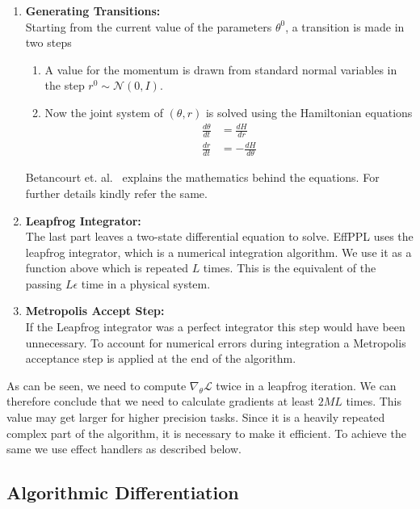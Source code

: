 \documentclass[a4paper,11pt]{article}
\theoremstyle{mytheor}
\begin{document}
	\begin{enumerate}
	    \item \textbf{Generating Transitions:}\\
    	Starting from the current value of the parameters $\theta^0$, a transition is made in two steps
    	\begin{enumerate}
    	    \item A value for the momentum is drawn from standard normal variables in the step $r^0 \sim \mathcal{N}(0, I)$. 
    	    \item Now the joint system of $(\theta, r)$ is solved using the Hamiltonian equations
    	    \begin{align*}
    	        \frac{d\theta}{dt} &= \frac{dH}{dr}\\
    	        \frac{dr}{dt} &= - \frac{dH}{d\theta}
    	    \end{align*}
    	\end{enumerate}
    	Betancourt et. al.~\cite{betancourt2018conceptual} explains the mathematics behind the equations. For further details kindly refer the same. 
    	\item \textbf{Leapfrog Integrator:}\\
    		The last part leaves a two-state differential equation to solve. EffPPL uses the leapfrog integrator, which is a numerical integration algorithm. We use it as a function above which is repeated $L$ times. This is the equivalent of the passing $L\epsilon$ time in a physical system. 
		\item \textbf{Metropolis Accept Step:}\\ If the Leapfrog integrator was a perfect integrator this step would have been unnecessary.  To account for numerical errors during integration a Metropolis acceptance step is applied at the end of the algorithm. 
	\end{enumerate}
	
	As can be seen, we need to compute $\nabla_\theta \mathcal{L}$ twice in a leapfrog iteration. We can therefore conclude that we need to calculate gradients at least $2ML$ times. This value may get larger for higher precision tasks. Since it is a heavily repeated complex part of the algorithm, it is necessary to make it efficient. To achieve the same we use effect handlers as described below. 
	 
	\subsection{Algorithmic Differentiation}
    
\end{document}
